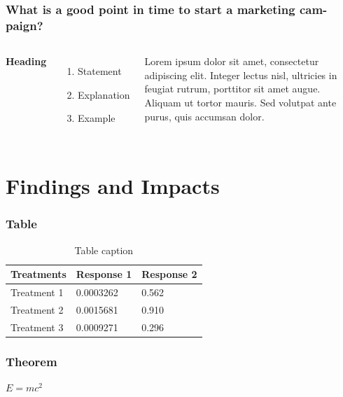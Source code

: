 \documentclass{beamer}
\begin{document}
\begin{frame}
\frametitle{What is a good point in time to start a marketing cam- paign?}
\begin{columns}[c] %

\textbf{Heading}
\begin{enumerate}
\item Statement
\item Explanation
\item Example
\end{enumerate}

Lorem ipsum dolor sit amet, consectetur adipiscing elit. Integer lectus nisl, ultricies in feugiat rutrum, porttitor sit amet augue. Aliquam ut tortor mauris. Sed volutpat ante purus, quis accumsan dolor.

\end{columns}
\end{frame}

\section{Findings and Impacts}

\begin{frame}
\frametitle{Table}
\begin{table}
\begin{tabular}{l l l}
\toprule
\textbf{Treatments} & \textbf{Response 1} & \textbf{Response 2}\\
\midrule
Treatment 1 & 0.0003262 & 0.562 \\
Treatment 2 & 0.0015681 & 0.910 \\
Treatment 3 & 0.0009271 & 0.296 \\
\bottomrule
\end{tabular}
\caption{Table caption}
\end{table}
\end{frame}


\begin{frame}
\frametitle{Theorem}
\begin{theorem}
$E = mc^2$
\end{theorem}
\end{frame}
\end{document}
